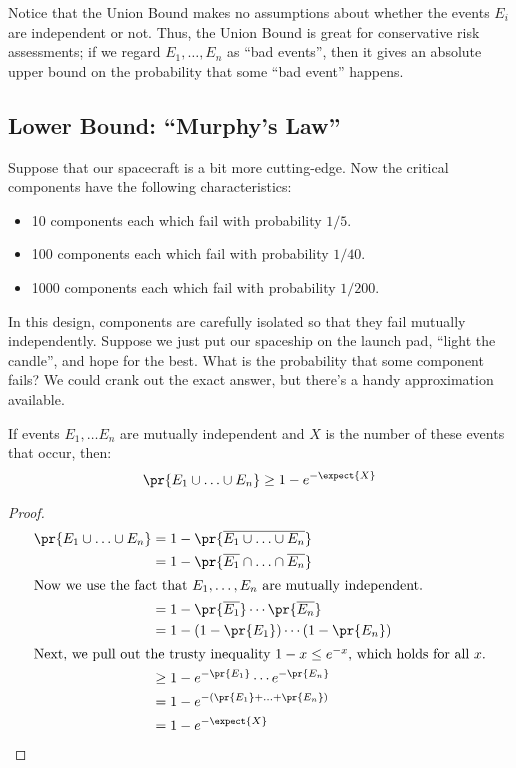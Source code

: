 \begin{editingnotes}
Notice that the Union Bound makes no assumptions about whether the
events $E_i$ are independent or not.  Thus, the Union Bound is great
for conservative risk assessments; if we regard $E_1, \ldots, E_n$ as
``bad events'', then it gives an absolute upper bound on the
probability that some ``bad event'' happens.


\subsection{Lower Bound:  ``Murphy's Law''}

Suppose that our spacecraft is a bit more cutting-edge.  Now the
critical components have the following characteristics:
%
\begin{itemize}
\item 10 components each which fail with probability $1/5$.
\item 100 components each which fail with probability $1/40$.
\item 1000 components each which fail with probability $1/200$.
\end{itemize}
%
In this design, components are carefully isolated so that they fail
mutually independently.  Suppose we just put our spaceship on the
launch pad, ``light the candle'', and hope for the best.  What is the
probability that some component fails?  We could crank out the exact
answer, but there's a handy approximation available.

\begin{theorem}
\label{th:murphy-edn}
If events $E_1, \ldots E_n$ are mutually independent and $X$ is the
number of these events that occur, then:
%
\[
\pr{E_1 \cup \ldots \cup E_n} \geq 1 - e^{-\expect{X}}
\]
\end{theorem}

\begin{proof}
\begin{align*}
\pr{E_1 \cup \ldots \cup E_n}
    & = 1 - \pr{\overline{E_1 \cup \ldots \cup E_n}} \\
    & = 1 - \pr{\overline{E_1} \cap \ldots \cap \overline{E_n}} \\
%
\intertext{Now we use the fact that $E_1, \ldots, E_n$ are mutually
independent.}
%
    & = 1 - \pr{\overline{E_1}} \cdots \pr{\overline{E_n}} \\
    & = 1 - (1 - \pr{E_1}) \cdots (1 - \pr{E_n}) \\
%
\intertext{Next, we pull out the trusty inequality $1 - x \leq
e^{-x}$, which holds for all $x$.}
%
    & \geq 1 - e^{-\pr{E_1}} \cdots e^{-\pr{E_n}} \\
    & = 1 - e^{-(\pr{E_1} + \ldots + \pr{E_n})} \\
    & = 1 - e^{-\expect{X}}
\end{align*}
\end{proof}


\end{editingnotes}

